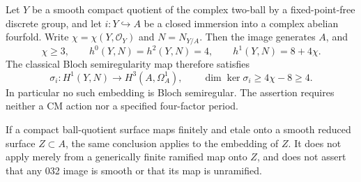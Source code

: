 \begin{theorem}
\label{thm:ball-fourfold-normal-obstruction}
Let $Y$ be a smooth compact quotient of the complex two-ball by a
fixed-point-free discrete group, and let $i:Y\hookrightarrow A$ be a
closed immersion into a complex abelian fourfold. Write
$\chi=\chi(Y,\mathcal O_Y)$ and $N=N_{Y/A}$. Then the image generates
$A$, and
\[
 \chi\ge3,\qquad h^0(Y,N)=h^2(Y,N)=4,
 \qquad h^1(Y,N)=8+4\chi.
 \tag{S44.1}
\]
The classical Bloch semiregularity map therefore satisfies
\[
 \sigma_i:H^1(Y,N)\longrightarrow H^3(A,\Omega_A^1),
 \qquad \dim\ker\sigma_i\ge4\chi-8\ge4.
 \tag{S44.2}
\]
In particular no such embedding is Bloch semiregular. The assertion
requires neither a CM action nor a specified four-factor period.

If a compact ball-quotient surface maps finitely and etale onto a smooth
reduced surface $Z\subset A$, the same conclusion applies to the
embedding of $Z$. It does not apply merely from a generically finite
ramified map onto $Z$, and does not assert that any 032 image is smooth
or that its map is unramified.
\end{theorem}
